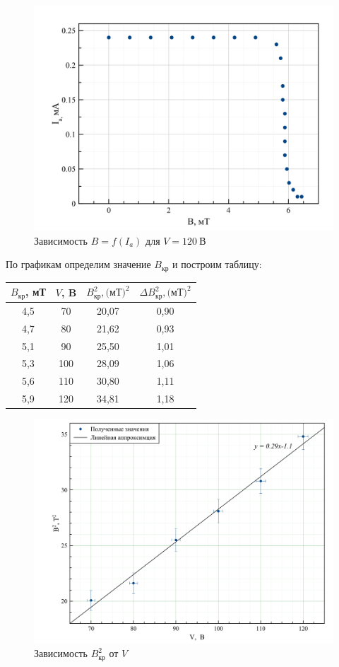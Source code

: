 \documentclass[a4paper, 12pt]{article}
\begin{document}
\begin{figure}[H]
\centering
	 \includegraphics[width = 0.6 \textwidth]{120V}
\caption{Зависимость $B = f(I_a)$ для $V = 120\: \text{В}$}
\end{figure}

По графикам определим значение $B_\text{кр}$ и построим таблицу:

\begin{table}[H]
\centering
\begin{tabular}{|c|c|c|c|}
\hline
$B_{\text{кр}}$, мТ & $V$, B & $B_{\text{кр}}^2, \text{(мТ)}^2$ & $\Delta B_{\text{кр}}^2, \text{(мТ)}^2$ \\ \hline
4,5     & 70   & 20,07       & 0,90         \\ \hline
4,7     & 80   & 21,62       & 0,93         \\ \hline
5,1     & 90   & 25,50       & 1,01         \\ \hline
5,3     & 100  & 28,09       & 1,06         \\ \hline
5,6     & 110  & 30,80       & 1,11         \\ \hline
5,9     & 120  & 34,81       & 1,18         \\ \hline
\end{tabular}
\end{table}

\begin{figure}[H]
\centering
	 \includegraphics[width = 0.7 \textwidth]{Graph3}
\caption{Зависимость $B_{\text{кр}}^2$ от $V$}
\end{figure}
\end{document}
